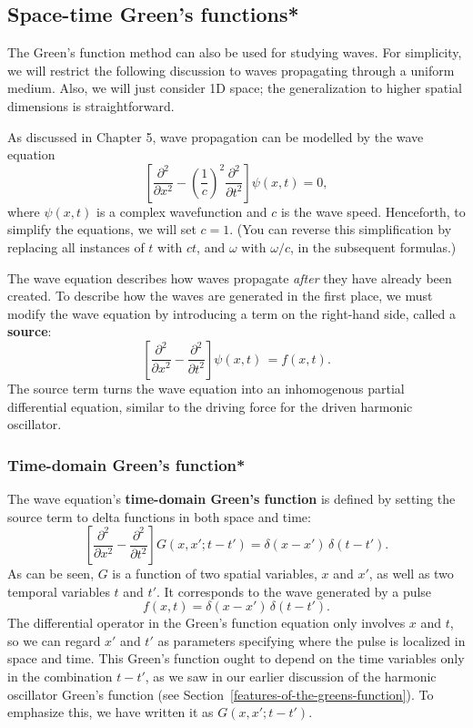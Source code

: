 \documentclass[10pt,a4paper]{article}
\begin{document}
\subsection{Space-time Green's functions*}
\label{space-time-greens-functions}

The Green's function method can also be used for studying waves. For
simplicity, we will restrict the following discussion to waves
propagating through a uniform medium.  Also, we will just consider 1D
space; the generalization to higher spatial dimensions is
straightforward.

As discussed in Chapter 5, wave propagation can be modelled by the
wave equation
\begin{equation}
\left[\frac{\partial^2}{\partial x^2} - \left(\frac{1}{c}\right)^2 \frac{\partial^2}{\partial t^2} \right] \psi(x,t) = 0,
\end{equation}
where $\psi(x,t)$ is a complex wavefunction and $c$ is the wave
speed. Henceforth, to simplify the equations, we will set $c = 1$.
(You can reverse this simplification by replacing all instances of $t$
with $c t$, and $\omega$ with $\omega/c$, in the subsequent
formulas.)

The wave equation describes how waves propagate \emph{after} they have
already been created. To describe how the waves are generated in the
first place, we must modify the wave equation by introducing a term on
the right-hand side, called a \textbf{source}:
\begin{equation}
\left[\frac{\partial^2}{\partial x^2} - \frac{\partial^2}{\partial t^2} \right] \psi(x,t)\, = f(x,t).
\end{equation}
The source term turns the wave equation into an inhomogenous partial
differential equation, similar to the driving force for the driven
harmonic oscillator.

\subsubsection{Time-domain Green's function*}
\label{time-domain-greens-function}

The wave equation's \textbf{time-domain Green's function} is defined
by setting the source term to delta functions in both space and time:
\begin{equation}
\left[\frac{\partial^2}{\partial x^2} - \frac{\partial^2}{\partial t^2} \right] G(x,x';t-t') = \delta(x-x')\, \delta(t-t').
\end{equation}
As can be seen, $G$ is a function of two spatial variables, $x$ and
$x'$, as well as two temporal variables $t$ and $t'$. It
corresponds to the wave generated by a pulse
\begin{equation}
f(x,t) = \delta(x-x')\,\delta(t-t').
\end{equation}
The differential operator in the Green's function equation only
involves $x$ and $t$, so we can regard $x'$ and $t'$ as parameters
specifying where the pulse is localized in space and time. This
Green's function ought to depend on the time variables only in the
combination $t-t'$, as we saw in our earlier discussion of the
harmonic oscillator Green's function (see
Section~\ref{features-of-the-greens-function}). To emphasize this, we
have written it as $G(x,x';t-t')$.
\end{document}
